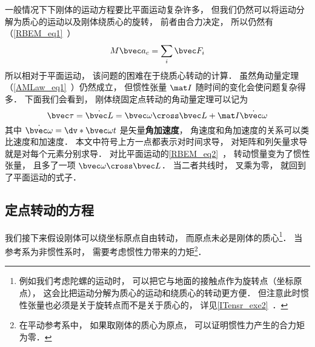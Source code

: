 

一般情况下下刚体的运动方程要比平面运动复杂许多， 但我们仍然可以将运动分解为质心的运动以及刚体绕质心的旋转， 前者由合力决定， 所以仍然有（\autoref{RBEM_eq1}~）
\begin{equation}\label{RBEqM_eq8}
M\bvec a_c = \sum_i \bvec F_i
\end{equation}
所以相对于平面运动， 该问题的困难在于绕质心转动的计算． 虽然角动量定理（\autoref{AMLaw_eq1}~）仍然成立， 但惯性张量 $\mat I$ 随时间的变化会使问题复杂得多． 下面我们会看到， 刚体绕固定点转动的角动量定理可以记为
\begin{equation}\label{RBEqM_eq1}
\bvec\tau = \dot{\bvec L} = \bvec\omega \cross \bvec L + \mat I \dot{\bvec\omega}
\end{equation}
其中 $\dot{\bvec\omega} = \dv*{\bvec\omega}{t}$ 是矢量\textbf{角加速度}， 角速度和角加速度的关系可以类比速度和加速度． 本文中符号上方一点都表示对时间求导， 对矩阵和列矢量求导就是对每个元素分别求导．  对比平面运动的\autoref{RBEM_eq2}~， 转动惯量变为了惯性张量， 且多了一项 $\bvec\omega \cross \bvec L$． 当二者共线时， 叉乘为零， 就回到了平面运动的式子．

\subsection{定点转动的方程}
我们接下来假设刚体可以绕坐标原点自由转动， 而原点未必是刚体的质心\footnote{例如我们考虑陀螺的运动时， 可以把它与地面的接触点作为旋转点（坐标原点）， 这会比把运动分解为质心的运动和绕质心的转动更方便． 但注意此时惯性张量也必须是关于旋转点而不是关于质心的， 详见\autoref{ITensr_exe2}~．}． 当参考系为非惯性系时， 需要考虑惯性力带来的力矩\footnote{在平动参考系中， 如果取刚体的质心为原点， 可以证明惯性力产生的合力矩为零．}．

